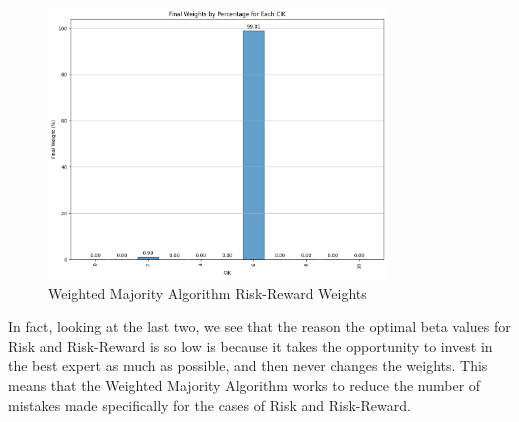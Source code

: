 \documentclass{article}
\begin{document}
    \begin{figure}[H]
        \centering
        \includegraphics[width=0.8\textwidth]{weighted_majority_risk_reward_final_weights.png}
        \caption{Weighted Majority Algorithm Risk-Reward Weights}
        \label{fig:weighted_majority_risk_reward_final_weights}
    \end{figure}

In fact, looking at the last two, we see that the reason the optimal beta values for Risk and Risk-Reward is so low is because it takes the opportunity to invest in the best expert as much as possible, and then never changes the weights. This means that the Weighted Majority Algorithm works to reduce the number of mistakes made specifically for the cases of Risk and Risk-Reward. 
\end{document}
